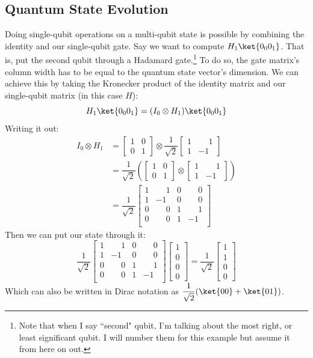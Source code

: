 \documentclass[11pt]{article}
\newcommand{\igate}{
  \begin{bmatrix}
  1 & 0 \\
  0 & 1
  \end{bmatrix}
}
\newcommand{\hgate}{
  \dfrac{1}{\sqrt2}
  \begin{bmatrix}
  1 & \phantom{-}1 \\
  1 & -1
  \end{bmatrix}
}
\begin{document}
\subsection{Quantum State Evolution}
Doing single-qubit operations on a multi-qubit state is possible by combining the identity and our single-qubit gate. Say we want to compute $H_1\ket{0_0 0_1}$. That is, put the second qubit through a Hadamard gate.\footnote{Note that when I say ``second" qubit, I'm talking about the most right, or least significant qubit. I will number them for this example but assume it from here on out.} To do so, the gate matrix's column width has to be equal to the quantum state vector's dimension. We can achieve this by taking the Kronecker product of the identity matrix and our single-qubit matrix (in this case $H$):
\[
  H_1\ket{0_0 0_1} = (I_0 \otimes H_1)\ket{0_0 0_1}
\]
\newpage
\noindent
Writing it out:
\begin{align}
  I_0 \otimes H_1 &=
  \igate{} \otimes \hgate{} \\
  &=
  \dfrac{1}{\sqrt2}
  \left(
  \igate{}
  \otimes
  \begin{bmatrix}
  1 & \phantom{-}1 \\
  1 & -1
  \end{bmatrix}
  \right) \\
  &= \dfrac{1}{\sqrt2}
  \begin{bmatrix}
  1 & \phantom{-}1 & 0 & \phantom{-}0 \\
  1 & -1 & 0 & \phantom{-}0 \\
  0 & \phantom{-}0 & 1 & \phantom{-}1 \\
  0 & \phantom{-}0 & 1 & -1 \\
  \end{bmatrix}
\end{align}
Then we can put our  state through it:
\[
  \dfrac{1}{\sqrt2}
  \begin{bmatrix}
  1 & \phantom{-}1 & 0 & \phantom{-}0 \\
  1 & -1 & 0 & \phantom{-}0 \\
  0 & \phantom{-}0 & 1 & \phantom{-}1 \\
  0 & \phantom{-}0 & 1 & -1 \\
  \end{bmatrix}
  \begin{bmatrix}
  1 \\
  0 \\
  0 \\
  0
  \end{bmatrix}
  =
  \dfrac{1}{\sqrt2}
  \begin{bmatrix}
  1 \\
  1 \\
  0 \\
  0
  \end{bmatrix}
\]
Which can also be written in Dirac notation as $\dfrac{1}{\sqrt2}(\ket{00} + \ket{01})$.
\end{document}

